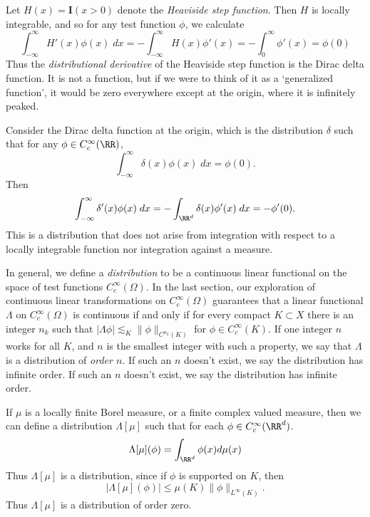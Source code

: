 \begin{example}
    Let $H(x) = \mathbf{I}(x > 0)$ denote the {\it Heaviside step function}. Then $H$ is locally integrable, and so for any test function $\phi$, we calculate
    \[ \int_{-\infty}^\infty H'(x) \phi(x)\; dx = - \int_{-\infty}^\infty H(x) \phi'(x) = - \int_0^\infty \phi'(x) = \phi(0) \]
    Thus the \emph{distributional derivative} of the Heaviside step function is the Dirac delta function. It is not a function, but if we were to think of it as a `generalized function', it would be zero everywhere except at the origin, where it is infinitely peaked.
\end{example}

\begin{example}
    Consider the Dirac delta function at the origin, which is the distribution $\delta$ such that for any $\phi \in C_c^\infty(\RR)$,
    \[ \int_{-\infty}^\infty \delta(x) \phi(x)\; dx = \phi(0). \]
    Then
    \[ \int_{-\infty}^\infty \delta'(x) \phi(x)\; dx = - \int_{\RR^d} \delta(x) \phi'(x)\; dx = - \phi'(0). \]
    This is a distribution that does not arise from integration with respect to a locally integrable function nor integration against a measure.
\end{example}

In general, we define a \emph{distribution} to be a continuous linear functional on the space of test functions $C_c^\infty(\Omega)$. In the last section, our exploration of continuous linear transformations on $C_c^\infty(\Omega)$ guarantees that a linear functional $\Lambda$ on $C_c^\infty(\Omega)$ is continuous if and only if for every compact $K \subset X$ there is an integer $n_k$ such that $|\Lambda \phi| \lesssim_K \| \phi \|_{C^{n_k}(K)}$ for $\phi \in C_c^\infty(K)$. If one integer $n$ works for all $K$, and $n$ is the smallest integer with such a property, we say that $\Lambda$ is a distribution of \emph{order $n$}. If such an $n$ doesn't exist, we say the distribution has infinite order. If such an $n$ doesn't exist, we say the distribution has infinite order.

\begin{example}
    If $\mu$ is a locally finite Borel measure, or a finite complex valued measure, then we can define a distribution $\Lambda[\mu]$ such that for each $\phi \in C_c^\infty(\RR^d)$.
    \[ \Lambda[\mu](\phi) = \int_{\RR^d} \phi(x) d\mu(x) \]
    Thus $\Lambda[\mu]$ is a distribution, since if $\phi$ is supported on $K$, then
    \[ |\Lambda[\mu](\phi)| \leq \mu(K) \| \phi \|_{L^\infty(K)}. \]
    Thus $\Lambda[\mu]$ is a distribution of order zero.
\end{example}

